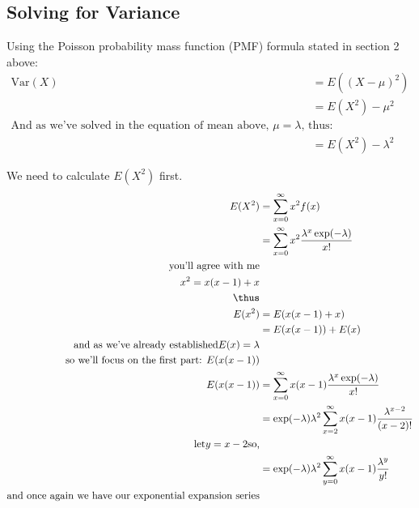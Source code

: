 \documentclass[a4paper]{article}
\begin{document}
\subsection{Solving for Variance}
\begin{center}
Using the Poisson probability mass function (PMF) formula stated in section 2 above:
\begin{align*}
\text{Var}(X) &= E((X - \mu)^2) \\
&= E(X^2) - \mu^2\\
\text{And as we've solved in the equation of  mean above, } \mu = \lambda \text{, thus:}\\
&= E(X^2) - \lambda^2
\end{align*}

We need to calculate \(E(X^2)\) first. 
\begin{align*}
E(X^2) &= \sum_{x=0}^{\infty} x^2 f(x) \\
&= \sum_{x=0}^{\infty} x^2 \frac{\lambda^x \exp(-\lambda)}{x!}\\
\text{you'll agree with me} \\
x^2 = x (x-1) + x \\
\thus \\
E(x^2) &= E(x (x-1) + x) \\
&= E(x (x-1)) + E(x)\\
\text{and as we've already established} E(x) = \lambda\\
\text{so we'll focus on the first part: } E(x (x-1))\\
E(x (x-1)) &=  \sum_{x=0}^{\infty} x(x-1) \frac{\lambda^x \exp(-\lambda)}{x!}\\
&= \exp(-\lambda) \lambda^2 \sum_{x=2}^{\infty} x(x-1) \frac{\lambda^{x-2} }{(x-2)!}\\
\text{let} y = x-2 \text{so,}\\
&= \exp(-\lambda) \lambda^2 \sum_{y=0}^{\infty} x(x-1) \frac{\lambda^{y} }{y!}\\
\text{and once again we have our exponential expansion series}\\

\end{align*}
\end{center}
\end{document}
